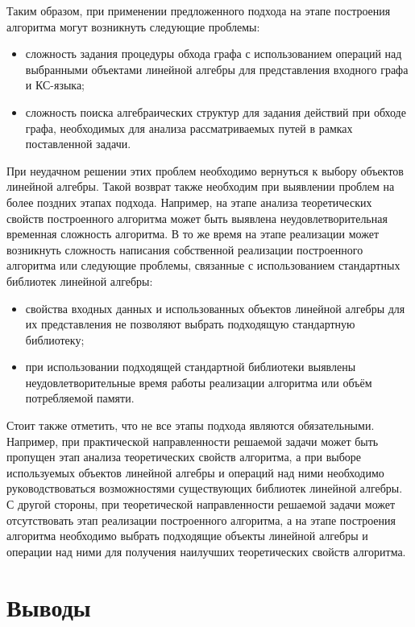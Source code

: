 Таким образом,  при применении предложенного подхода на этапе построения алгоритма могут возникнуть следующие проблемы:

\begin{itemize}
    \item сложность задания процедуры обхода графа с использованием операций над выбранными объектами линейной алгебры для представления входного графа и КС-языка;
    \item сложность поиска алгебраических структур для задания действий при обходе графа, необходимых для анализа рассматриваемых путей в рамках поставленной задачи.
\end{itemize}

При неудачном решении этих проблем необходимо вернуться к выбору объектов линейной алгебры. Такой возврат  также необходим при выявлении проблем на более поздних этапах подхода. Например, на этапе анализа теоретических свойств построенного алгоритма может быть выявлена неудовлетворительная временная сложность алгоритма. В то же время на этапе реализации может возникнуть сложность написания собственной реализации построенного алгоритма или следующие проблемы, связанные с использованием стандартных библиотек линейной алгебры:
\begin{itemize}
    \item свойства входных данных и использованных объектов линейной алгебры для их представления не позволяют выбрать подходящую стандартную библиотеку;
    \item при использовании подходящей стандартной библиотеки выявлены неудовлетворительные время работы реализации алгоритма или объём потребляемой памяти.
\end{itemize}

Стоит также отметить, что не все этапы подхода являются обязательными. Например, при практической направленности решаемой задачи может быть пропущен этап анализа теоретических свойств алгоритма, а при выборе используемых объектов линейной алгебры и операций над ними необходимо руководствоваться возможностями существующих библиотек линейной алгебры. С другой стороны, при теоретической направленности решаемой задачи может отсутствовать этап реализации построенного алгоритма, а на этапе построения алгоритма необходимо выбрать подходящие объекты линейной алгебры и операции над ними для получения наилучших теоретических свойств алгоритма.

\section{Выводы}

